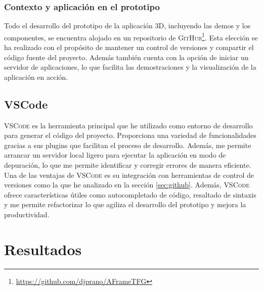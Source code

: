 \documentclass[a4paper, 11pt]{book}
\begin{document}
\subsection{Contexto y aplicación en el prototipo}
Todo el desarrollo del prototipo de la aplicación \textsc{3D}, incluyendo las demos y los componentes, se encuentra alojado en un repositorio de \textsc{GitHub}\footnote{\url{https://github.com/djprano/AFrameTFG}}. Esta elección se ha realizado con el propósito de mantener un control de versiones y compartir el código fuente del proyecto.
Además también cuenta con la opción de iniciar un servidor de aplicaciones, lo que facilita las demostraciones y la visualización de la aplicación en acción.

\section{VSCode}
\textsc{VSCode} es la herramienta principal que he utilizado como entorno de desarrollo para generar el código del proyecto. Proporciona una variedad de funcionalidades gracias a sus plugins que facilitan el proceso de desarrollo. 
Además, me permite arrancar un servidor local ligero para ejecutar la aplicación en modo de depuración, lo que me permite identificar y corregir errores de manera eficiente.
Una de las ventajas de \textsc{VSCode} es su integración con herramientas de control de versiones como la que he analizado en la sección \ref{sec:github}. Además, \textsc{VSCode} ofrece características útiles como autocompletado de código, resaltado de sintaxis y me permite refactorizar lo que agiliza el desarrollo del prototipo y mejora la productividad.




\clearpage

\chapter{Resultados}
\label{chap:resultados}
\end{document}
